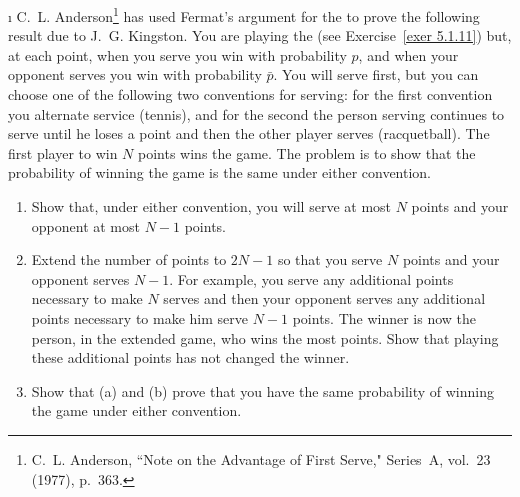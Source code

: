 \begin{LJSItem}
\i\label{exer 5.1.15} C.~L. Anderson\footnote{C.~L. Anderson, ``Note on the
Advantage of First Serve,"  Series~A, vol.~23 (1977),
p.~363.} has used Fermat's argument for the  to prove the following result
due to J.~G. Kingston.  You are playing the  (see
Exercise~\ref{exer 5.1.11}) but, at each point, when you serve you win with probability $p$, and
when your opponent serves you win with probability $\bar{p}$.  You will serve first, but you
can choose one of the following two conventions for serving: for the first convention you
alternate service (tennis), and for the second the person serving continues to serve
until he loses a point and then the other player serves (racquetball).  The
first player to win $N$ points wins the game.  The problem is to show that the probability of
winning the game is the same under either convention.
\begin{enumerate}

\item Show that, under either convention, you will serve at most $N$ points and your opponent
at most $N - 1$ points.

\item Extend the number of points to $2N - 1$ so that you serve $N$ points and your opponent
serves $N - 1$.  For example, you serve any additional points necessary to make $N$ serves and
then your opponent serves any additional points necessary to make him serve $N - 1$ points. 
The winner is now the person, in the extended game, who wins the most points.  Show that
playing these additional points has not changed the winner.

\item Show that (a) and (b) prove that you have the same probability of winning the game under
either convention.
\end{enumerate}


\end{LJSItem}

